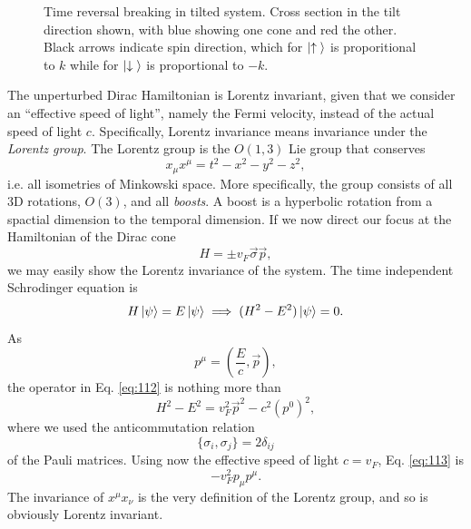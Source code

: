 \begin{figure}[h]
  \centering
  \caption{Time reversal breaking in tilted system.
    Cross section in the tilt direction shown, with blue showing one cone and red the other.
    Black arrows indicate spin direction, which for \(\ket{\uparrow {}}\) is proporitional to  \(k\) while for \(\ket{\downarrow {}}\) is proportional to \( -k \).
  }
\end{figure}

The unperturbed Dirac Hamiltonian is Lorentz invariant, given that we consider an ``effective speed of light'', namely the Fermi velocity, instead of the actual speed of light \( c \).
Specifically, Lorentz invariance means invariance under the \emph{Lorentz group}.
The Lorentz group is the \( O(1,3) \) Lie group that conserves
\[
x_{\mu } x^{\mu } = t^2 - x^2 - y^2 - z^2,
\]
i.e. all isometries of Minkowski space.
More specifically, the group consists of all 3D rotations, \( O(3) \), and all \emph{boosts}.
A boost is a hyperbolic rotation from a spactial dimension to the temporal dimension.
If we now direct our focus at the Hamiltonian of the Dirac cone
\[
H = \pm v_{F} \vec{\sigma} \vec{p},
\]
we may easily show the Lorentz invariance of the system.
The time independent Schrodinger equation is
\begin{equation}
  \label{eq:112}
  H \ket{\psi } = E \ket{\psi } \implies (H^2 - E^2) \ket{\psi } = 0.
\end{equation}
As
\[
p^{\mu } = \left(\frac{E}{c}, \vec{p}\right),
\]
the operator in Eq. \eqref{eq:112} is nothing more than
\begin{equation}
  \label{eq:113}
  H^2-E^2 = v_{F}^2 \vec{p}^2 - c^2 \left(p^0\right)^2 ,
\end{equation}
where we used the anticommutation relation
\[
\{\sigma_{i}, \sigma_{j}\} =  2 \delta _{ij}
\]
of the Pauli matrices.
Using now the effective speed of light \( c=v_F \), Eq. \eqref{eq:113} is
\begin{equation}
  \label{eq:114}
  - v_F^2 p_{\mu } p^{\mu }.
\end{equation}
The invariance of \( x^{\mu} x_{\nu} \) is the very definition of the Lorentz group, and so is obviously Lorentz invariant.

